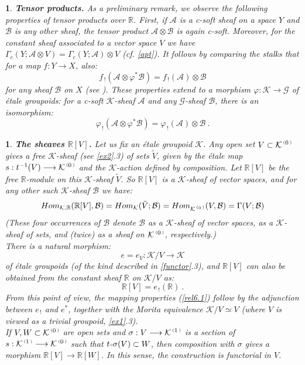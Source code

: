 \documentclass[a4paper]{article}
\newtheorem{num}[st]{}
\newcommand{\f}{\ensuremath{\varphi}}
\newcommand{\rmap}{\longrightarrow}
\newcommand{\Ka}{\ensuremath{\mathcal{K}}}
\newcommand{\G}{\ensuremath{\mathcal{G}}}
\newcommand{\A}{\ensuremath{\mathcal{A}}}
\newcommand{\B}{\ensuremath{\mathcal{B}}}
\newcommand{\gc}{\ensuremath{\Gamma_c}}
\newcommand{\ps}{{\raise 1pt\hbox{\tiny (}}}
\newcommand{\pd}{{\raise 1pt\hbox{\tiny )}}}
\newcommand{\nK}[1]{\ensuremath{\Ka^{\,\ps #1\,\pd}}}
\def\compose{{\raise 1pt\hbox{$\scriptscriptstyle\circ$}}}
\begin{document}
\begin{num}
\label{tens}
\emph{
{\bf Tensor products.} As a preliminary remark, we observe the following properties of tensor products over $\mathbb{R}$. First, if $\A$ is a c-soft sheaf on a space $Y$ and $\B$ is any other sheaf, the tensor product $\A\otimes\B$ is again c-soft. Moreover, for the constant sheaf associated to a vector space $V$ we have $\gc (Y; \A\otimes V) = \gc (Y; \A) \otimes V$ (cf. \ref{apt}). It follows by comparing the stalks that for a map $f: Y\rmap X$, also:
\[ f_{\, !}(\A \otimes \f^{*}\B) = f_{\, !}(\A) \otimes \B \]
for any sheaf $\B$ on $X$ (see \cite{Borel, Iv}). These properties extend to a morphism $\f: \Ka\rmap \G$ of \'etale groupoids: for a c-soft $\Ka$-sheaf $\A$ and any $\G$-sheaf $\B$, there is an isomorphism:
\[ \f_{\, !}(\A \otimes \f^{*}\B) = \f_{\, !}(\A) \otimes \B \ .\]
}
\end{num}




\begin{num}
\emph{
{\bf The sheaves $\mathbb{R}[V]$.} Let us fix an \'etale groupoid $\Ka$. Any open set $V \subset \nK{0}$ gives a free $\Ka$-sheaf (see \ref{ex2}.3) of sets $\tilde{V}$, given by the \'etale map $s: t^{-1}(V) \rmap \nK{0}$ and the $\Ka$-action defined by composition. Let $\mathbb{R}[V]$ be the free $\mathbb{R}$-module on this $\Ka$-sheaf $\tilde{V}$. So $\mathbb{R}[V]$ is a $\Ka$-sheaf of vector spaces, and for any other such $\Ka$-sheaf $\B$ we have:
\begin{equation}
\label{rel6.1}
Hom_{\Ka, \mathbb{R}}(\mathbb{R}[V], \B) = Hom_{\Ka}(\tilde{V}; \B) = Hom_{\nK{0}}(V, \B) = \Gamma (V; \B)
\end{equation}
(These four occurrences of $\B$ denote $\B$ as a $\Ka$-sheaf of vector spaces, as a $\Ka$-sheaf of sets, and (twice) as a sheaf on $\nK{0}$, respectively.)\\
\hspace*{.3in} There is a natural morphism:
\begin{equation}
\label{rel6.2}
e= e_{V} : \Ka/V \rmap \Ka
\end{equation}
of \'etale groupoids (of the kind described in \ref{functor}.3), and $\mathbb{R}[V]$ can also be obtained from the constant sheaf $\mathbb{R}$ on $\Ka/V$ as:
\begin{equation}
\label{rel6.3}
\mathbb{R}[V] = e_{\, !}( \mathbb{R})\ .
\end{equation}
From this point of view, the mapping properties (\ref{rel6.1}) follow by the adjunction between $e_{\, !}$ and $e^{*}$, together with the Morita equivalence $\Ka/V \simeq V$ (where $V$ is viewed as a trivial groupoid, \ref{ex1}.3).\\
\hspace*{.3in} If $V, W \subset \nK{0}$ are open sets and $\sigma: V \rmap \nK{1}$ is a section of $s: \nK{1} \rmap \nK{0}$ such that $t\compose \sigma (V) \subset W$, then composition with $\sigma$ gives a morphism $\mathbb{R}[V] \rmap \mathbb{R}[W]$. In this sense, the construction is functorial in $V$.
}
\end{num}
\end{document}
